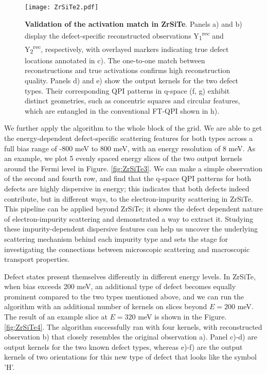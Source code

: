 \begin{figure}
	\texttt{[image: ZrSiTe2.pdf]} 
	\centering
	\caption[\textbf{Validation of the activation match in ZrSiTe}]{\textbf{Validation of the activation match in ZrSiTe}. Panels a) and b) display the defect-specific reconstructed observations Y\textsubscript{1}\textsuperscript{rec} and Y\textsubscript{2}\textsuperscript{rec}, respectively, with overlayed markers indicating true defect locations annotated in c). The one-to-one match between reconstructions and true activations confirms high reconstruction quality. Panels d) and e) show the output kernels for the two defect types. Their corresponding QPI patterns in q-space (f, g) exhibit distinct geometries, such as concentric squares and circular features, which are entangled in the conventional FT-QPI shown in h).}
	\label{fig:ZrSiTe2}
\end{figure}

We further apply the algorithm to the whole block of the grid. We are able to get the energy-dependent defect-specific scattering features for both types across a full bias range of -800 meV to 800 meV, with an energy resolution of 8 meV. As an example, we plot 5 evenly spaced energy slices of the two output kernels around the Fermi level in Figure. \ref{fig:ZrSiTe3}. We can make a simple observation of the second and fourth row, and find that the q-space QPI patterns for both defects are highly dispersive in energy; this indicates that both defects indeed contribute, but in different ways, to the electron-impurity scattering in ZrSiTe. This pipeline can be applied beyond ZrSiTe; it shows the defect dependent nature of electron-impurity scattering and demonstrated a way to extract it. Studying these impurity-dependent dispersive features can help us uncover the underlying scattering mechanism behind each impurity type and sets the stage for investigating the connections between microscopic scattering and macroscopic transport properties. 

Defect states present themselves differently in different energy levels. In ZrSiTe, when bias exceeds 200 meV, an additional type of defect becomes equally prominent compared to the two types mentioned above, and we can run the algorithm with an additional number of kernels on slices beyond $E=200$ meV. The result of an example slice at $E=320$ meV is shown in the Figure. \ref{fig:ZrSiTe4}. The algorithm successfully ran with four kernels, with reconstructed observation b) that closely resembles the original observation a). Panel c)-d) are output kernels for the two known defect types, whereas e)-f) are the output kernels of two orientations for this new type of defect that looks like the symbol 'H'.  

